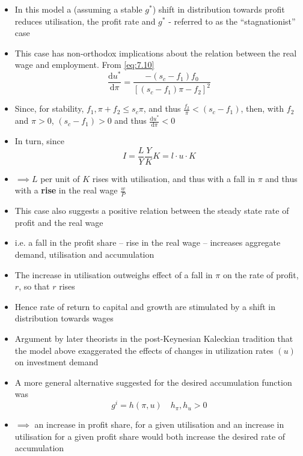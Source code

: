 \documentclass{article}
\begin{document}
	\begin{itemize}
		\item In this model a (assuming a stable \( g^* \)) shift in distribution towards profit reduces utilisation, the profit rate and \( g^* \) - referred to as the ``stagnationist'' case
		\item This case has non-orthodox implications about the relation between the real wage and employment. From \cref{eq:7.10}
		\begin{equation}
			\frac{\mathrm{d} u^*}{\mathrm{d} \pi} = \frac{-(s_c-f_1)f_0}{[(s_c-f_1)\pi-f_2]^2} \label{eq:7.11}
		\end{equation}
		\item Since, for stability, \( f_1,\pi + f_2 \leq s_c\pi \), and thus \( \frac{f_2}{\pi} < (s_c-f_1) \), then, with \( f_2 \) and \( \pi > 0 \), \( (s_c-f_1) > 0 \) and thus \( \frac{\mathrm{d} u^*}{\mathrm{d} \pi} < 0 \)
		\item In turn, since
		\begin{equation}
			I = \frac{L}{Y}\frac{Y}{K}K=l\cdot u \cdot K \label{eq:7.12}
		\end{equation}
		\item \( \implies L \)  per unit of \( K \) rises with utilisation, and thus with a fall in \( \pi \) and thus with a \textbf{rise} in the real wage \( \frac{w}{P} \)
		\item This case also suggests a positive relation between the steady state rate of profit and the real wage 
		\item i.e. a fall in the profit share -- rise in the real wage -- increases aggregate demand, utilisation and accumulation
		\item The increase in utilisation outweighs effect of a fall in \( \pi \) on the rate of profit, \( r \),  so that \( r \) rises
		\item Hence rate of return to capital and growth are stimulated by a shift in distribution towards wages
		\item Argument by later theorists in the post-Keynesian Kaleckian tradition that the model above exaggerated the effects of changes in utilization rates \( (u) \) on investment demand
		\item A more general alternative suggested for the desired accumulation function was
		\begin{equation}
			g^i = h(\pi,u) \quad h_{\pi},h_u>0 \label{eq:7.13}
		\end{equation}
		\item \( \implies \) an increase in profit share, for a given utilisation and an increase in utilisation for a given profit share would both increase the desired rate of accumulation

\end{itemize}
\end{document}
